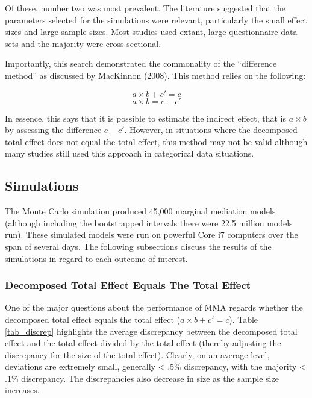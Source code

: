 \documentclass[]{DissertateUSU}
\begin{document}
Of these, number two was most prevalent. The literature suggested that
the parameters selected for the simulations were relevant, particularly
the small effect sizes and large sample sizes. Most studies used extant,
large questionnaire data sets and the majority were cross-sectional.

Importantly, this search demonstrated the commonality of the
``difference method'' as discussed by MacKinnon (2008). This method
relies on the following:

\singlespacing

\begin{equation}
a \times b + c' = c
\end{equation}\begin{equation}
a \times b = c - c'
\end{equation}

\doublespacing

\noindent In essence, this says that it is possible to estimate the
indirect effect, that is \(a \times b\) by assessing the difference
\(c - c'\). However, in situations where the decomposed total effect
does not equal the total effect, this method may not be valid although
many studies still used this approach in categorical data situations.

\subsection{Simulations}\label{simulations-1}

The Monte Carlo simulation produced 45,000 marginal mediation models
(although including the bootstrapped intervals there were 22.5 million
models run). These simulated models were run on powerful Core i7
computers over the span of several days. The following subsections
discuss the results of the simulations in regard to each outcome of
interest.

\subsubsection{Decomposed Total Effect Equals The Total
Effect}\label{decomposed-total-effect-equals-the-total-effect}

One of the major questions about the performance of MMA regards whether
the decomposed total effect equals the total effect
(\(a \times b + c' = c\)). Table \ref{tab_discrep} highlights the
average discrepancy between the decomposed total effect and the total
effect divided by the total effect (thereby adjusting the discrepancy
for the size of the total effect). Clearly, on an average level,
deviations are extremely small, generally \textless{} .5\% discrepancy,
with the majority \textless{} .1\% discrepancy. The discrepancies also
decrease in size as the sample size increases.
\end{document}
